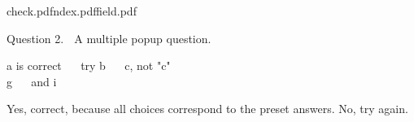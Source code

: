 \documentclass[dvips]{article}
\begin{document}

{check.pdf}{ndex.pdf}{field.pdf} %
{ Question 2. $\;$ A multiple popup question. %
    \begin{center}
    a is correct \popupone {} $\quad$ %
    try b \popuptwo {} $\quad$ %
    c, not "c" \popupthree {} \\ %
    g \popupfour {}  $\quad$
    and i \popupfive {}
    \end{center}
} %
{Yes, correct, because all choices correspond to the preset answers.} %
{No, try again.} %
\end{document}
